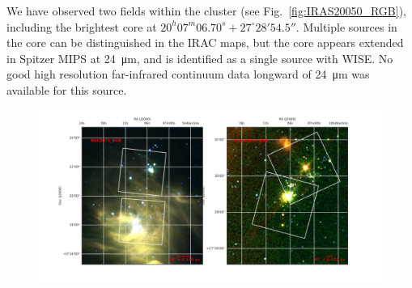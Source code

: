 We have observed two fields within the cluster (see Fig.~\ref{fig:IRAS20050_RGB}), including the brightest core at $20^h 07^m 06.70^s +27^{\circ} 28'54.5''$. Multiple sources in the core can be distinguished in the IRAC maps, but the core appears extended in Spitzer MIPS at \SI{24}{\micro\meter}, and is identified as a single source with WISE. No good high resolution far-infrared continuum data longward of \SI{24}{\micro\meter} was available for this source.


\begin{figure}
\begin{center}
\includegraphics[width=\textwidth]{Figures/RGB.png}
\label{fig:RGB}
\caption{
}
\end{center}
\end{figure}

